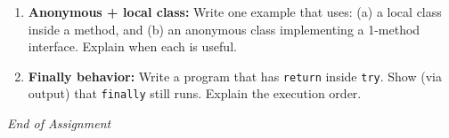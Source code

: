 \documentclass[11pt,a4paper]{article}
\begin{document}
\begin{enumerate}[label=H\arabic*., leftmargin=*]
  \item \textbf{Anonymous + local class:} Write one example that uses:
    (a) a local class inside a method, and
    (b) an anonymous class implementing a 1-method interface.
    Explain when each is useful.

  \item \textbf{Finally behavior:} Write a program that has \texttt{return} inside \texttt{try}.
    Show (via output) that \texttt{finally} still runs. Explain the execution order.
\end{enumerate}

\vfill
\noindent\textit{End of Assignment}
\end{document}
